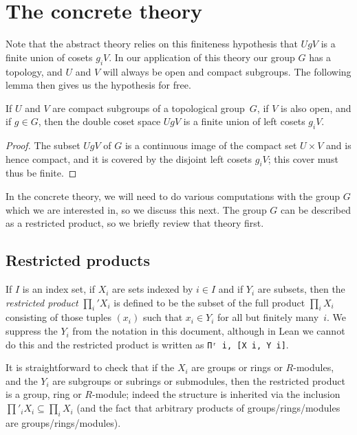 \section{The concrete theory}

Note that the abstract theory relies on this finiteness hypothesis that $UgV$
is a finite union of cosets $g_iV$. In our application of this theory our group
$G$ has a topology, and $U$ and $V$ will always be open and compact subgroups.
The following lemma then gives us the hypothesis for free.

\begin{lemma}
  \label{QuotientGroup.mk_image_finite_of_compact_of_open}
  \leanok
  If $U$ and $V$ are compact subgroups of a topological group~$G$,
  if $V$ is also open, and if $g\in G$, then the double coset space $UgV$
  is a finite union of left cosets $g_iV$.
\end{lemma}
\begin{proof}
  The subset $UgV$ of $G$ is a continuous image of the compact set $U\times V$
  and is hence compact, and it is covered by the disjoint left cosets $g_iV$;
  this cover must thus be finite.
\end{proof}

In the concrete theory, we will need to do various computations with the
group $G$ which we are interested in, so we discuss this next. The group $G$
can be described as a restricted product, so we briefly review that theory
first.

\subsection{Restricted products}

If $I$ is an index set, if $X_i$ are sets indexed by $i\in I$ and if $Y_i$
are subsets, then the \emph{restricted product} $\prod_i'X_i$ is defined
to be the subset of the full product $\prod_i X_i$ consisting of those
tuples $(x_i)$ such that $x_i\in Y_i$ for all but finitely many~$i$. We suppress
the $Y_i$ from the notation in this document, although in Lean we cannot do this and
the restricted product is written as {\tt Πʳ i, [X i, Y i]}.

It is straightforward to check that if the $X_i$ are groups or rings or $R$-modules,
and the $Y_i$ are subgroups or subrings or submodules, then the restricted product
is a group, ring or $R$-module; indeed the structure is inherited via the
inclusion $\prod'_iX_i\subseteq\prod_iX_i$ (and the fact that arbitrary products
of groups/rings/modules are groups/rings/modules).

